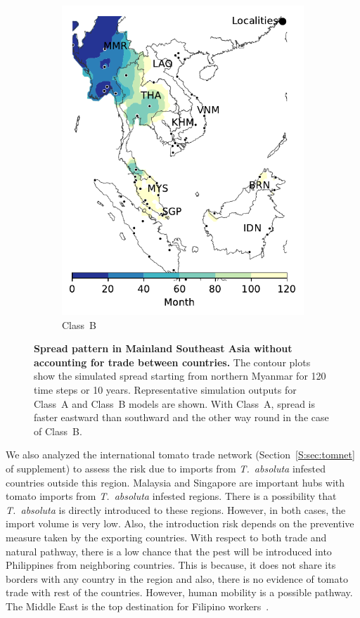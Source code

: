 \documentclass[11pt]{article}
\newcommand{\tuta}{\emph{T.~absoluta}}
\theoremstyle{definition}
\begin{document}
\begin{figure}[ht]
\begin{subfigure}[b]{.47\textwidth}
    \includegraphics[width=\textwidth]{../cellular_automata/results/contour/MSA_model-B_m1_l3.pdf}
    \caption{Class~B\label{fig:msaClassB}}
\end{subfigure}
\caption{\textbf{Spread pattern in Mainland Southeast Asia without
accounting for trade between countries.} The contour plots show the
simulated spread starting from northern Myanmar for 120 time steps or 10
years. Representative simulation outputs for Class~A and Class~B models are
shown. With {Class~A}, spread is faster eastward than southward and the
other way round in the case of Class~B.\label{fig:msaClassAB} }
\end{figure}

We also analyzed the international tomato
trade network (Section~\ref{S:sec:tomnet} of supplement) to assess the risk
due to imports from \tuta{} infested countries outside this region.
Malaysia and Singapore are important hubs with
tomato imports from \tuta{} infested regions. There is a possibility that
\tuta{} is directly introduced to these regions.  However, in both cases,
the import volume is very low. Also, the introduction risk depends on the
preventive measure taken by the exporting countries. With respect to both
trade and natural pathway, there is a low chance that the pest will be
introduced into Philippines from neighboring countries.  This is because,
it does not share its borders with any country in the region and also,
there is no evidence of tomato trade with rest of the countries. However,
human mobility is a possible pathway. The Middle East is the top
destination for Filipino workers~\cite{rodriguez2011philippine}.
\end{document}
